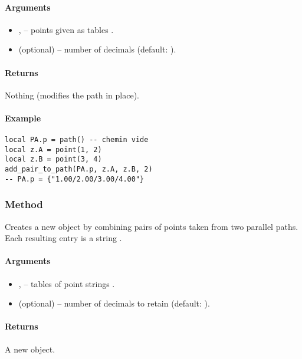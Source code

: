 \paragraph{Arguments}
\begin{itemize}
  \item {},  – points given as tables .
  \item {} (optional) – number of decimals (default: ).
\end{itemize}

\paragraph{Returns} Nothing (modifies the path in place).

\paragraph{Example}
\begin{verbatim}
local PA.p = path() -- chemin vide
local z.A = point(1, 2)
local z.B = point(3, 4)
add_pair_to_path(PA.p, z.A, z.B, 2)
-- PA.p = {"1.00/2.00/3.00/4.00"}
\end{verbatim}



\subsubsection{Method }
\label{ssub:method_tkzmeth_path_path_from_pairs}

Creates a new  object by combining pairs of points taken from two parallel paths. Each resulting entry is a string .

\paragraph{Arguments}
\begin{itemize}
  \item {},  – tables of point strings .
  \item {} (optional) – number of decimals to retain (default: ).
\end{itemize}

\paragraph{Returns} A new  object.

